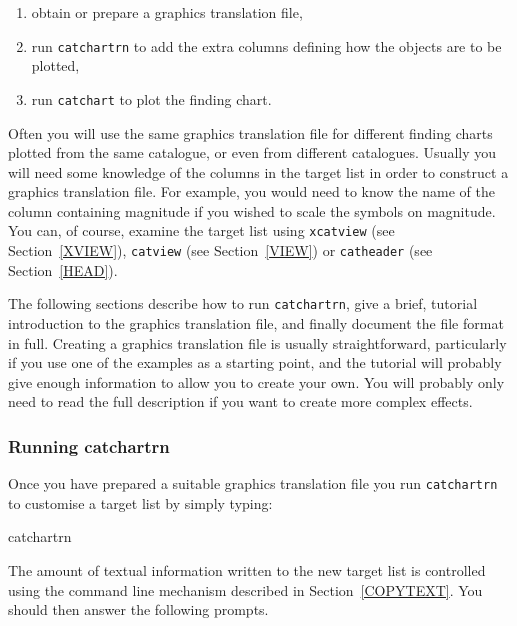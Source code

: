 \documentclass[twoside,11pt]{starlink}
\begin{document}
\begin{enumerate}

  \item obtain or prepare a graphics translation file,

  \item run \texttt{catchartrn} to add the extra columns defining how
   the objects are to be plotted,

  \item run \texttt{catchart} to plot the finding chart.

\end{enumerate}

Often you will use the same graphics translation file for different
finding charts plotted from the same catalogue, or even from different
catalogues.  Usually you will need some knowledge of the columns in
the target list in order to construct a graphics translation file.
For example, you would need to know the name of the column containing
magnitude if you wished to scale the symbols on magnitude.  You can, of
course, examine the target list using \texttt{xcatview} (see
Section~\ref{XVIEW}), \texttt{catview} (see Section~\ref{VIEW}) or \texttt{catheader} (see Section~\ref{HEAD}).

The following sections describe how to run \texttt{catchartrn}, give a brief,
tutorial introduction to the graphics translation file, and finally
document the file format in full.  Creating a graphics translation file is
usually straightforward, particularly if you use one of the examples as a
starting point, and the tutorial will probably give enough information to
allow you to create your own.  You will probably only need to read the
full description if you want to create more complex effects.

\subsubsection{\label{RCATCHARTRN}Running catchartrn}

Once you have prepared a suitable graphics translation file you run
\texttt{catchartrn} to customise a target list by simply typing:

\begin{terminalv}
catchartrn
\end{terminalv}

The amount of textual information written to the new target list is
controlled using the command line mechanism described in
Section~\ref{COPYTEXT}.  You should then answer the following prompts.
\end{document}
